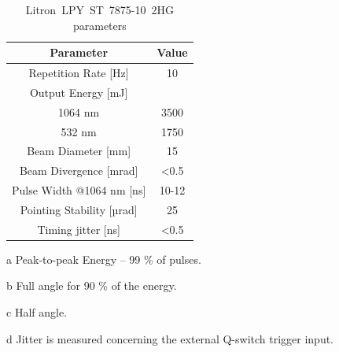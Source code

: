 \begin{table}[h!] 
\centering
        \caption[Litron~LPY~ST~7875-10~2HG parameters]{Litron~LPY~ST~7875-10~2HG parameters \protect\cite{litronmanual}}
    \begin{threeparttable}
        \begin{tabular}{|c | c|} 
        \hline
            \textbf{Parameter} & \textbf{Value} \\ [0.5ex] 
        \hline
        Repetition Rate [Hz] & 10  \\ 
        \hline
            Output Energy [mJ] & \\
            1064 nm & 3500 \tnote{a} \\
            532 nm & 1750 \\
        \hline
            Beam Diameter [mm] & 15  \\
        \hline
            Beam Divergence [mrad] & \textless 0.5 \tnote{b} \\ 
        \hline
            Pulse Width @1064 nm [ns] & 10-12 \\
        \hline
            Pointing Stability [µrad] & 25 \tnote{c} \\
        \hline
            Timing jitter [ns] & \textless 0.5 \tnote{d}  \\
        \hline
        \end{tabular}
        \begin{tablenotes}
            \small
            \item[a] Peak-to-peak Energy -- 99 \% of pulses. 
            \item[b] Full angle for 90 \% of the energy.
            \item[c] Half angle.
            \item[d] Jitter is measured concerning the external Q-switch trigger input.
        \end{tablenotes}
        
    \end{threeparttable}

\label{tab:litronparameters}
\end{table}

